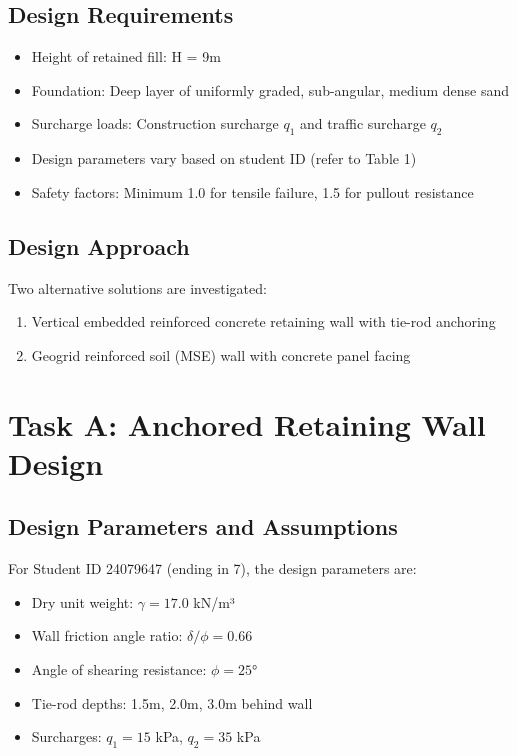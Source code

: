 \documentclass[10pt,a4paper,twocolumn]{article}
\begin{document}
\subsection{Design Requirements}
\begin{itemize}
\item Height of retained fill: H = 9m
\item Foundation: Deep layer of uniformly graded, sub-angular, medium dense sand
\item Surcharge loads: Construction surcharge $q_1$ and traffic surcharge $q_2$
\item Design parameters vary based on student ID (refer to Table 1)
\item Safety factors: Minimum 1.0 for tensile failure, 1.5 for pullout resistance
\end{itemize}

\subsection{Design Approach}
Two alternative solutions are investigated:
\begin{enumerate}
\item Vertical embedded reinforced concrete retaining wall with tie-rod anchoring
\item Geogrid reinforced soil (MSE) wall with concrete panel facing
\end{enumerate}

\newpage

\section{Task A: Anchored Retaining Wall Design}

\subsection{Design Parameters and Assumptions}

For Student ID 24079647 (ending in 7), the design parameters are:
\begin{itemize}
\item Dry unit weight: $\gamma = 17.0$ kN/m³
\item Wall friction angle ratio: $\delta/\phi = 0.66$
\item Angle of shearing resistance: $\phi = 25°$
\item Tie-rod depths: 1.5m, 2.0m, 3.0m behind wall
\item Surcharges: $q_1 = 15$ kPa, $q_2 = 35$ kPa
\end{itemize}
\end{document}
